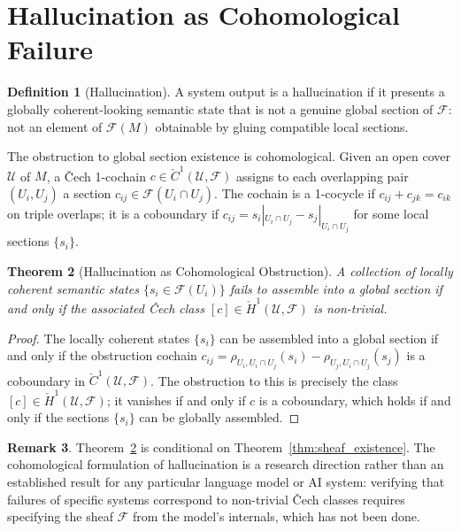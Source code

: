 \documentclass[12pt, oneside]{book}
\theoremstyle{flyxion}
\newtheorem{theorem}{Theorem}[chapter]
\theoremstyle{definition}
\newtheorem{definition}[theorem]{Definition}
\newtheorem{remark}[theorem]{Remark}
\begin{document}
\section{Hallucination as Cohomological Failure}

\begin{definition}[Hallucination]
A system output is a hallucination if it presents a
globally coherent-looking semantic state that is not
a genuine global section of $\mathcal{F}$: not an
element of $\mathcal{F}(M)$ obtainable by gluing
compatible local sections.
\end{definition}

The obstruction to global section existence is
cohomological. Given an open cover $\mathcal{U}$ of
$M$, a \v{C}ech 1-cochain $c \in \check{C}^1(\mathcal{U},
\mathcal{F})$ assigns to each overlapping pair $(U_i,
U_j)$ a section $c_{ij} \in \mathcal{F}(U_i \cap U_j)$.
The cochain is a 1-cocycle if $c_{ij} + c_{jk} = c_{ik}$
on triple overlaps; it is a coboundary if $c_{ij} =
s_i|_{U_i \cap U_j} - s_j|_{U_i \cap U_j}$ for some
local sections $\{s_i\}$.

\begin{theorem}[Hallucination as Cohomological Obstruction]
\label{thm:hallucination}
A collection of locally coherent semantic states
$\{s_i \in \mathcal{F}(U_i)\}$ fails to assemble into
a global section if and only if the associated \v{C}ech
class $[c] \in \check{H}^1(\mathcal{U}, \mathcal{F})$
is non-trivial.
\end{theorem}

\begin{proof}
The locally coherent states $\{s_i\}$ can be assembled
into a global section if and only if the obstruction
cochain $c_{ij} = \rho_{U_i, U_i \cap U_j}(s_i) -
\rho_{U_j, U_i \cap U_j}(s_j)$ is a coboundary in
$\check{C}^1(\mathcal{U}, \mathcal{F})$. The
obstruction to this is precisely the class $[c] \in
\check{H}^1(\mathcal{U}, \mathcal{F})$; it vanishes
if and only if $c$ is a coboundary, which holds if and
only if the sections $\{s_i\}$ can be globally assembled.
\end{proof}

\begin{remark}
Theorem~\ref{thm:hallucination} is conditional on
Theorem~\ref{thm:sheaf_existence}. The cohomological
formulation of hallucination is a research direction
rather than an established result for any particular
language model or AI system: verifying that failures
of specific systems correspond to non-trivial \v{C}ech
classes requires specifying the sheaf $\mathcal{F}$
from the model's internals, which has not been done.
\end{remark}
\end{document}
